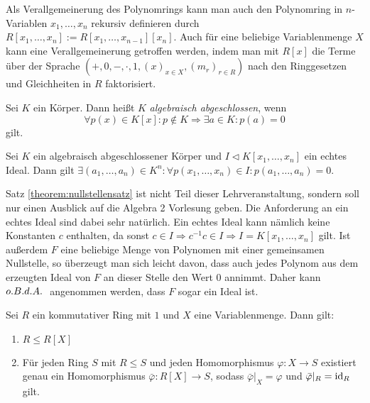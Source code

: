 \begin{remark}
    Als Verallgemeinerung des Polynomrings kann man auch den Polynomring in $n$-Variablen $x_1,\ldots,x_n$ rekursiv definieren
    durch $R[x_1,\ldots,x_n]:=R[x_1,\ldots,x_{n-1}][x_n]$. Auch für eine beliebige Variablenmenge $X$ kann eine Verallgemeinerung
    getroffen werden, indem man mit $R[x]$ die Terme über der Sprache $(+,0,-,\cdot,1,(x)_{x\in X},(m_r)_{r\in R})$ nach den Ringgesetzen
    und Gleichheiten in $R$ faktorisiert.
\end{remark}

\begin{definition}
    Sei $K$ ein Körper. Dann heißt $K$ \emph{algebraisch abgeschlossen}, wenn
    $$\forall p(x)\in K[x]:p\not\in K\Rightarrow \exists a\in K:p(a)=0$$
    gilt.
\end{definition}

\begin{theorem}\label{theorem:nullstellensatz}
    Sei $K$ ein algebraisch abgeschlossener Körper und $I\triangleleft K[x_1,\ldots,x_n]$ ein echtes Ideal.
    Dann gilt $\exists(a_1,\ldots,a_n)\in K^n:\forall p(x_1,\ldots,x_n)\in I:p(a_1,\ldots,a_n)=0.$
\end{theorem}

\begin{remark}
    Satz \ref{theorem:nullstellensatz} ist nicht Teil dieser Lehrveranstaltung, sondern soll nur einen Ausblick auf die Algebra 2 Vorlesung geben.
    Die Anforderung an ein echtes Ideal sind dabei sehr natürlich. Ein echtes Ideal kann nämlich keine Konstanten $c$ enthalten, da sonst
    $c\in I\Rightarrow c^{-1}c\in I\Rightarrow I=K[x_1,\ldots,x_n]$ gilt. Ist außerdem $F$ eine beliebige Menge von
    Polynomen mit einer gemeinsamen Nullstelle, so überzeugt man sich leicht davon, dass auch jedes Polynom aus dem erzeugten Ideal
    von $F$ an dieser Stelle den Wert $0$ annimmt. Daher kann $o. B. d. A.\ $ angenommen werden, dass $F$ sogar ein Ideal ist.
\end{remark}

\begin{proposition}
    Sei $R$ ein kommutativer Ring mit $1$ und $X$ eine Variablenmenge. Dann gilt:
    \begin{enumerate}
        \item $R\leq R[X]$
        \item Für jeden Ring $S$ mit $R\leq S$ und jeden Homomorphismus $\varphi:X\to S$
        existiert genau ein Homomorphismus $\bar{\varphi}:R[X]\to S$, sodass $\bar{\varphi}|_X=\varphi$ und $\bar{\varphi}|_R=\operatorname{id}_R$ gilt.
    \end{enumerate}
\end{proposition}

